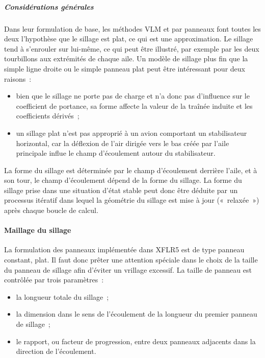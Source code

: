 \documentclass[a4paper,twoside,12pt,dvips]{article}
\begin{document}
\subparagraph{Considérations générales}

Dans leur formulation de base, les méthodes VLM et par panneaux font toutes
les deux l’hypothèse que le sillage est plat, ce qui est une approximation. 
Le sillage tend à s’enrouler sur lui-même, ce qui peut être illustré, par 
exemple par les deux tourbillons aux extrémités de chaque aile. Un modèle de sillage plus fin que la simple ligne droite ou le simple panneau plat peut être intéressant pour deux raisons~:

\begin{itemize}
	\item bien que le sillage ne porte pas de charge et n’a donc pas d’influence 
	sur le coefficient de portance, sa forme affecte la valeur de la traînée 
	induite et les coefficients dérivés~;
	\item un sillage plat n’est pas approprié à un avion comportant un 
	stabilisateur horizontal, car la déflexion de l’air dirigée vers le bas 
	créée par l’aile principale influe le champ d’écoulement autour du stabilisateur.
\end{itemize}

La forme du sillage est déterminée par le champ d’écoulement derrière l’aile, et à son tour, le champ d’écoulement dépend de la forme du sillage. La forme du sillage prise dans une situation d’état stable peut donc être déduite par un processus itératif dans lequel la géométrie du sillage est mise à jour («~relaxée~») après chaque boucle de calcul. 

\paragraph{Maillage du sillage}

La formulation des panneaux implémentée dans XFLR5 est de type panneau constant, plat. Il faut donc prêter une attention spéciale dans le choix de la taille du panneau de sillage afin d’éviter un vrillage excessif. La taille de panneau est contrôlée par trois paramètres~:

\begin{itemize}
  \item la longueur totale du sillage~;
  \item la dimension dans le sens de l’écoulement de la longueur du premier 
  panneau de sillage~;
  \item le rapport, ou facteur de progression, entre deux panneaux adjacents 
  dans la direction de l’écoulement.
\end{itemize}
\end{document}
